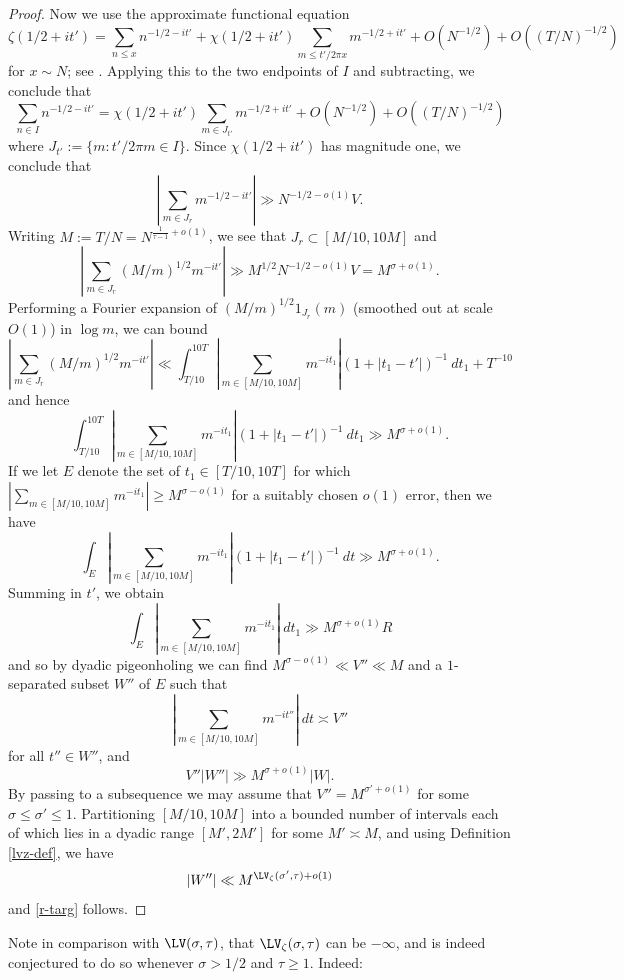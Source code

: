 \begin{proof}
    Now we use the approximate functional equation
    $$ \zeta(1/2+it') = \sum_{n \leq x} n^{-1/2-it'} + \chi(1/2+it') \sum_{m \leq t' / 2\pi x} m^{-1/2+it'} + O(N^{-1/2}) + O((T/N)^{-1/2})$$
    for $x \sim N$; see \cite[Theorem 4.1]{ivic}.  Applying this to the two endpoints of $I$ and subtracting, we conclude that
    $$ \sum_{n \in I} n^{-1/2-it'} =\chi(1/2+it') \sum_{m \in J_{t'}} m^{-1/2+it'} + O(N^{-1/2}) + O((T/N)^{-1/2})$$
    where $J_{t'} := \{ m: t' / 2\pi m \in I \}$. Since $\chi(1/2+it')$ has magnitude one, we conclude that
    $$ |\sum_{m \in J_r} m^{-1/2-it'}| \gg N^{-1/2-o(1)} V.$$
    Writing $M := T/N = N^{\frac{1}{\tau-1}+o(1)}$, we see that $J_r \subset [M/10, 10M]$ and
    $$ |\sum_{m \in J_r} (M/m)^{1/2} m^{-it'}| \gg M^{1/2} N^{-1/2-o(1)} V = M^{\sigma+o(1)}.$$
    Performing a Fourier expansion of $(M/m)^{1/2} 1_{J_r}(m)$ (smoothed out at scale $O(1)$) in $\log m$, we can bound
    $$ |\sum_{m \in J_r} (M/m)^{1/2} m^{-it'}| \ll \int_{T/10}^{10T} |\sum_{m \in [M/10,10M]} m^{-it_1}| (1 + |t_1-t'|)^{-1}\ dt_1 + T^{-10}$$
    and hence
    $$ \int_{T/10}^{10T} |\sum_{m \in [M/10,10M]} m^{-it_1}| (1 + |t_1-t'|)^{-1}\ dt_1  \gg M^{\sigma+o(1)}.$$
    If we let $E$ denote the set of $t_1 \in [T/10, 10T]$ for which $|\sum_{m \in [M/10,10M]} m^{-it_1}| \geq M^{\sigma-o(1)}$ for a suitably chosen $o(1)$ error, then we have
    $$ \int_E |\sum_{m \in [M/10,10M]} m^{-it_1}| (1 + |t_1-t'|)^{-1}\ dt  \gg M^{\sigma+o(1)}.$$
    Summing in $t'$, we obtain
    $$ \int_E |\sum_{m \in [M/10,10M]} m^{-it_1}|\ dt_1  \gg M^{\sigma+o(1)} R$$
    and so by dyadic pigeonholing we can find $M^{\sigma-o(1)} \ll V'' \ll M$ and a $1$-separated subset $W''$ of $E$ such that
    $$ |\sum_{m \in [M/10,10M]} m^{-it''}|\ dt \asymp V''$$
    for all $t'' \in W''$, and
    $$ V'' |W''| \gg M^{\sigma+o(1)} |W|.$$
    By passing to a subsequence we may assume that $V'' = M^{\sigma'+o(1)}$ for some $\sigma \leq \sigma' \leq 1$. Partitioning $[M/10,10M]$ into a bounded number of intervals each of which lies in a dyadic range $[M',2M']$ for some $M' \asymp M$, and using Definition \ref{lvz-def}, we have
    $$ |W''|  \ll M^{\LV_\zeta(\sigma',\tau)+o(1)}$$
    and \eqref{r-targ} follows.
\end{proof}

Note in comparison with $\LV(\sigma,\tau)$, that $\LV_\zeta(\sigma,\tau)$ can be $-\infty$, and is indeed conjectured to do so whenever $\sigma>1/2$ and $\tau \geq 1$. Indeed:

